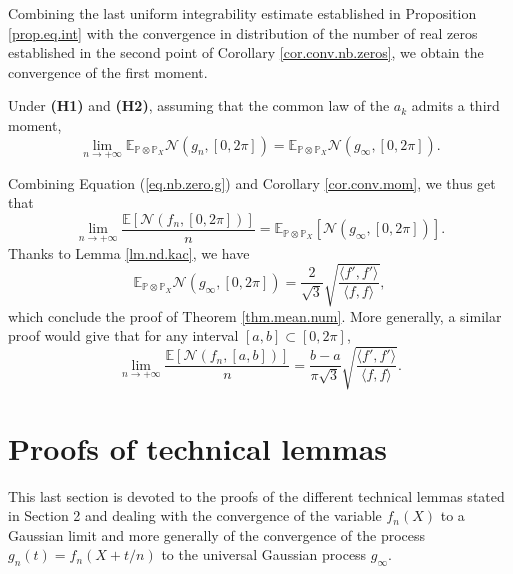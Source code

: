 \documentclass{svproc}
\newcommand{\Prob}{\mathbb{P}}
\newcommand \Esp {\mathbb{E}}
\begin{document}
Combining the last uniform integrability estimate established in Proposition \ref{prop.eq.int} with the convergence in distribution of the number of real zeros established in the second point of Corollary \ref{cor.conv.nb.zeros}, we obtain the convergence of the first moment.
\begin{corollary}\label{cor.conv.mom} Under \textbf{(H1)} and  \textbf{(H2)}, assuming that the common law of the $a_k$ admits a third moment,
$$\lim_{n\to +\infty}\Esp_{\Prob \otimes \Prob_X}\mathcal{N}(g_n,[0,2\pi]) =\Esp_{\Prob \otimes \Prob_X} \mathcal{N}(g_{\infty},[0,2\pi]).$$
\end{corollary}
\noindent
Combining Equation (\ref{eq.nb.zero.g}) and Corollary \ref{cor.conv.mom}, we thus get that 
$$\lim_{n \to +\infty} \frac{\Esp \left[\mathcal{N}(f_n,[0,2\pi])\right]}{n} = \Esp_{\Prob \otimes \Prob_X}\left[\mathcal{N}(g_{\infty},[0,2\pi])\right].$$
Thanks to Lemma \ref{lm.nd.kac}, we have
$$\Esp_{\Prob \otimes \Prob_X}\mathcal{N}(g_{\infty},[0,2\pi])=\frac{2}{\sqrt{3}}\sqrt{\frac{\langle f',f' \rangle}{\langle f,f\rangle}},$$
which conclude the proof of Theorem \ref{thm.mean.num}.
More generally, a similar proof would give that for any interval $[a,b]\subset [0,2\pi]$, 
$$\lim_{n \to+\infty}\frac{\Esp[\mathcal{N}(f_n,[a,b])]}{n} =\frac{b-a}{\pi \sqrt{3}} \sqrt{\frac{\langle f',f'\rangle}{\langle f,f\rangle}}.$$




\section{Proofs of technical lemmas} \label{sec.tech}
This last section is devoted to the proofs of the different technical lemmas stated in Section 2 and dealing with the convergence of the variable $f_n(X)$ to a Gaussian limit and more generally of the convergence of the process $g_n(t)=f_n(X+t/n)$ to the universal Gaussian process $g_{\infty}$. 

\end{document}
